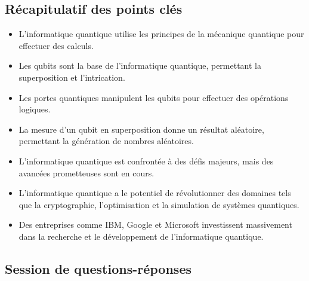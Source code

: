 \documentclass{article}
\begin{document}
\subsection{Récapitulatif des points clés}
\begin{itemize}
  \item L'informatique quantique utilise les principes de la mécanique quantique pour effectuer des calculs.
  \item Les qubits sont la base de l'informatique quantique, permettant la superposition et l'intrication.
  \item Les portes quantiques manipulent les qubits pour effectuer des opérations logiques.
  \item La mesure d'un qubit en superposition donne un résultat aléatoire, permettant la génération de nombres aléatoires.
  \item L'informatique quantique est confrontée à des défis majeurs, mais des avancées prometteuses sont en cours.
  \item L'informatique quantique a le potentiel de révolutionner des domaines tels que la cryptographie, l'optimisation et la simulation de systèmes quantiques.
  \item Des entreprises comme IBM, Google et Microsoft investissent massivement dans la recherche et le développement de l'informatique quantique.
\end{itemize}

\subsection{Session de questions-réponses}
\end{document}
